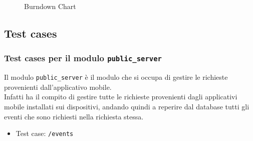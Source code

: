 \documentclass{article}
\begin{document}
\begin{figure}[H]
    \centering
    \caption{Burndown Chart}
    \label{fig:burndown}
\end{figure}

\clearpage

\subsection{Test cases}
\subsubsection{Test cases per il modulo \texttt{public\_server}}
Il modulo \texttt{public\_server} è il modulo che si occupa di gestire le richieste provenienti dall'applicativo mobile.\\
Infatti ha il compito di gestire tutte le richieste provenienti dagli applicativi mobile installati sui dispositivi, andando quindi a reperire dal database tutti gli eventi che sono richiesti nella richiesta stessa.\\

\begin{itemize}
    \item Test case: \texttt{/events}
\end{itemize}
\end{document}
